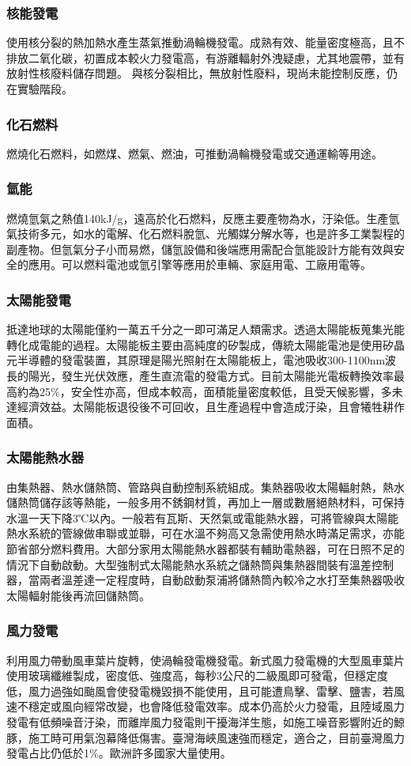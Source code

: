 \documentclass[a4paper,12pt]{report}
\begin{document}
\subsubsection{核能發電}
使用核分裂的熱加熱水產生蒸氣推動渦輪機發電。成熟有效、能量密度極高，且不排放二氧化碳，初置成本較火力發電高，有游離輻射外洩疑慮，尤其地震帶，並有放射性核廢料儲存問題。
與核分裂相比，無放射性廢料，現尚未能控制反應，仍在實驗階段。
\subsubsection{化石燃料}
燃燒化石燃料，如燃煤、燃氣、燃油，可推動渦輪機發電或交通運輸等用途。
\subsubsection{氫能}
燃燒氫氣之熱值140kJ/g，遠高於化石燃料，反應主要產物為水，汙染低。生產氫氣技術多元，如水的電解、化石燃料脫氫、光觸媒分解水等，也是許多工業製程的副產物。但氫氣分子小而易燃，儲氫設備和後端應用需配合氫能設計方能有效與安全的應用。可以燃料電池或氫引擎等應用於車輛、家庭用電、工廠用電等。
\subsubsection{太陽能發電}
抵達地球的太陽能僅約一萬五千分之一即可滿足人類需求。透過太陽能板蒐集光能轉化成電能的過程。太陽能板主要由高純度的矽製成，傳統太陽能電池是使用矽晶元半導體的發電裝置，其原理是陽光照射在太陽能板上，電池吸收300-1100nm波長的陽光，發生光伏效應，產生直流電的發電方式。目前太陽能光電板轉換效率最高約為25\%，安全性亦高，但成本較高，面積能量密度較低，且受天候影響，多未達經濟效益。太陽能板退役後不可回收，且生產過程中會造成汙染，且會犧牲耕作面積。
\subsubsection{太陽能熱水器}
由集熱器、熱水儲熱筒、管路與自動控制系統組成。集熱器吸收太陽輻射熱，熱水儲熱筒儲存該等熱能，一般多用不銹鋼材質，再加上一層或數層絕熱材料，可保持水溫一天下降3℃以內。一般若有瓦斯、天然氣或電能熱水器，可將管線與太陽能熱水系統的管線做串聯或並聯，可在水溫不夠高又急需使用熱水時滿足需求，亦能節省部分燃料費用。大部分家用太陽能熱水器都裝有輔助電熱器，可在日照不足的情況下自動啟動。大型強制式太陽能熱水系統之儲熱筒與集熱器間裝有溫差控制器，當兩者溫差達一定程度時，自動啟動泵浦將儲熱筒內較冷之水打至集熱器吸收太陽輻射能後再流回儲熱筒。
\subsubsection{風力發電}
利用風力帶動風車葉片旋轉，使渦輪發電機發電。新式風力發電機的大型風車葉片使用玻璃纖維製成，密度低、強度高，每秒3公尺的二級風即可發電，但穩定度低，風力過強如颱風會使發電機毀損不能使用，且可能遭鳥擊、雷擊、鹽害，若風速不穩定或風向經常改變，也會降低發電效率。成本仍高於火力發電，且陸域風力發電有低頻噪音汙染，而離岸風力發電則干擾海洋生態，如施工噪音影響附近的鯨豚，施工時可用氣泡幕降低傷害。臺灣海峽風速強而穩定，適合之，目前臺灣風力發電占比仍低於1\%。歐洲許多國家大量使用。
\end{document}
